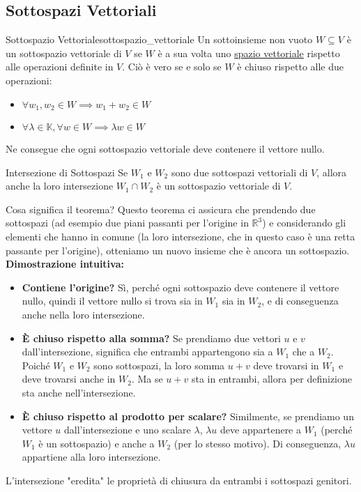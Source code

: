 \documentclass{article}
\begin{document}
\subsection{Sottospazi Vettoriali}

\begin{definition}{Sottospazio Vettoriale}{sottospazio_vettoriale}
    Un sottoinsieme non vuoto $W \subseteq V$ è un sottospazio vettoriale di $V$ se $W$ è a sua volta uno \hyperref[def:spazio_vettoriale]{spazio vettoriale} rispetto alle operazioni definite in $V$.
    Ciò è vero se e solo se $W$ è chiuso rispetto alle due operazioni:
    \begin{itemize}
        \item $\forall w_1, w_2 \in W \implies w_1 + w_2 \in W$
        \item $\forall \lambda \in \mathbb{K}, \forall w \in W \implies \lambda w \in W$
    \end{itemize}
    Ne consegue che ogni sottospazio vettoriale deve contenere il vettore nullo.
\end{definition}

\begin{theorem}{Intersezione di Sottospazi}{}
    Se $W_1$ e $W_2$ sono due sottospazi vettoriali di $V$, allora anche la loro intersezione $W_1 \cap W_2$ è un sottospazio vettoriale di $V$.
\end{theorem}

\begin{explanation}{Cosa significa il teorema?}{}
    Questo teorema ci assicura che prendendo due sottospazi (ad esempio due piani passanti per l'origine in $\mathbb{R}^3$) e considerando gli elementi che hanno in comune (la loro intersezione, che in questo caso è una retta passante per l'origine), otteniamo un nuovo insieme che è ancora un sottospazio.
    \textbf{Dimostrazione intuitiva:}
    \begin{itemize}
        \item \textbf{Contiene l'origine?} Sì, perché ogni sottospazio deve contenere il vettore nullo, quindi il vettore nullo si trova sia in $W_1$ sia in $W_2$, e di conseguenza anche nella loro intersezione.
        \item \textbf{È chiuso rispetto alla somma?} Se prendiamo due vettori $u$ e $v$ dall'intersezione, significa che entrambi appartengono sia a $W_1$ che a $W_2$. Poiché $W_1$ e $W_2$ sono sottospazi, la loro somma $u+v$ deve trovarsi in $W_1$ e deve trovarsi anche in $W_2$. Ma se $u+v$ sta in entrambi, allora per definizione sta anche nell'intersezione.
        \item \textbf{È chiuso rispetto al prodotto per scalare?} Similmente, se prendiamo un vettore $u$ dall'intersezione e uno scalare $\lambda$, $\lambda u$ deve appartenere a $W_1$ (perché $W_1$ è un sottospazio) e anche a $W_2$ (per lo stesso motivo). Di conseguenza, $\lambda u$ appartiene alla loro intersezione.
    \end{itemize}
    L'intersezione "eredita" le proprietà di chiusura da entrambi i sottospazi genitori.
\end{explanation}
\end{document}
